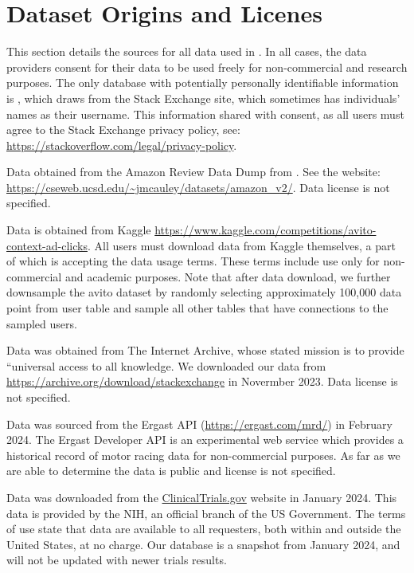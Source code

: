 \section{Dataset Origins and Licenes}\label{app:data}

This section details the sources for all data used in \relbench. In all cases, the data providers consent for their data to be used freely for non-commercial and research purposes. The only database with potentially personally identifiable information is \stackex, which draws from the Stack Exchange site, which sometimes has individuals' names as their username.  This information shared with consent, as all users must agree to the Stack Exchange privacy policy, see: \url{https://stackoverflow.com/legal/privacy-policy}.

\xhdr{\amazon} Data obtained from the Amazon Review Data Dump from \cite{ni2019justifying}. See the website: \url{https://cseweb.ucsd.edu/~jmcauley/datasets/amazon_v2/}. Data license is not specified.

\xhdr{\avito} Data is obtained from Kaggle \url{https://www.kaggle.com/competitions/avito-context-ad-clicks}. All \relbench users must download data from Kaggle themselves, a part of which is accepting the data usage terms. These terms include use only for non-commercial and academic purposes. Note that after data download, we further downsample the avito dataset by randomly selecting approximately 100,000 data point from user table and sample all other tables that have connections to the sampled users.

\xhdr{\stackex} Data was obtained from The Internet Archive, whose stated mission is to provide ``universal access to all knowledge. We downloaded our data from \url{https://archive.org/download/stackexchange} in Novermber 2023. Data license is not specified.

\xhdr{\fone} Data was sourced from the Ergast API (\url{https://ergast.com/mrd/}) in February 2024. The Ergast Developer API is an experimental web service which provides a historical record of motor racing data for non-commercial purposes. As far as we are able to determine the data is public and license is not specified.

\xhdr{\trials} Data was downloaded from the \url{ClinicalTrials.gov} website in January 2024. This data is provided by the NIH, an official branch of the US Government. The terms of use state that data are available to all requesters, both within and outside the United States, at no charge. Our \trials database is a snapshot from January 2024, and will not be updated with newer trials results.

